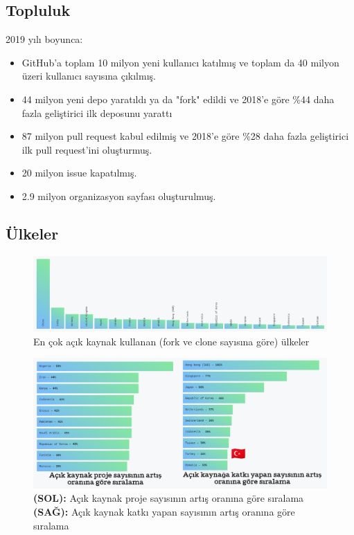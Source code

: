 \documentclass[11pt]{article}
\begin{document}
\subsection{Topluluk}
\label{sec:orga3f14e2}
2019 yılı boyunca:
\begin{itemize}
\item GitHub'a toplam 10 milyon yeni kullanıcı katılmış ve toplam da 40 milyon
üzeri kullanıcı sayısına çıkılmış.
\item 44 milyon yeni depo yaratıldı ya da "fork" edildi ve 2018'e göre \%44 daha
fazla geliştirici ilk deposunu yarattı
\item 87 milyon pull request kabul edilmiş ve 2018'e göre \%28 daha fazla
geliştirici ilk pull request'ini oluşturmuş.
\item 20 milyon issue kapatılmış.
\item 2.9 milyon organizasyon sayfası oluşturulmuş.
\end{itemize}
\subsection{Ülkeler}
\label{sec:org0f3752d}
\begin{figure}[htbp]
\centering
\includegraphics[width=.9\linewidth]{gorseller/github-ulke-kullanim.png}
\caption{En çok açık kaynak kullanan (fork ve clone sayısına göre) ülkeler}
\end{figure}

\begin{figure}[htbp]
\centering
\includegraphics[width=.9\linewidth]{gorseller/github-ulkeler-acik-kaynak.png}
\caption[\textbf{(SOL):} \textbf{(SAĞ):}]{\textbf{(SOL):} Açık kaynak proje sayısının artış oranına göre sıralama \textbf{(SAĞ):} Açık kaynak katkı yapan sayısının artış oranına göre sıralama}
\end{figure}
\end{document}
